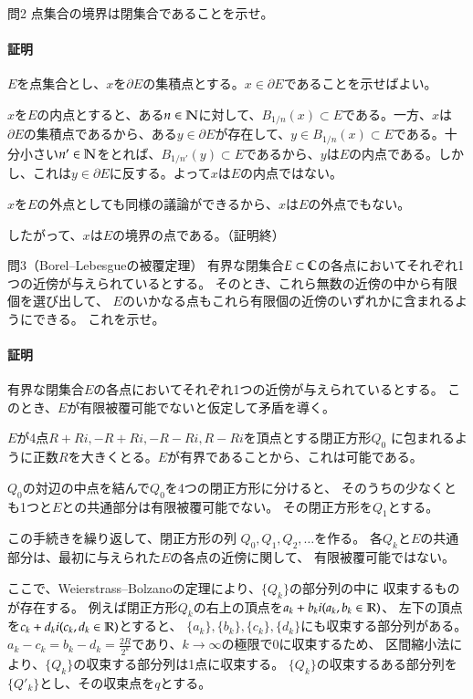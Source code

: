 \begin{mysimplebox}{問2}
    点集合の境界は閉集合であることを示せ。 
\end{mysimplebox}
\paragraph{証明}
$E$を点集合とし、$x$を$\partial E$の集積点とする。$x\in\partial E$であることを示せばよい。

$x$を$E$の内点とすると、ある$n\in\mathbb{N}$に対して、$B_{1/n}(x)\subset E$である。一方、$x$は$\partial E$の集積点であるから、ある$y\in\partial E$が存在して、$y\in B_{1/n}(x)\subset E$である。十分小さい$n'\in\mathbb{N}$をとれば、$B_{1/n'}(y)\subset E$であるから、$y$は$E$の内点である。しかし、これは$y\in\partial E$に反する。よって$x$は$E$の内点ではない。

$x$を$E$の外点としても同様の議論ができるから、$x$は$E$の外点でもない。

したがって、$x$は$E$の境界の点である。（証明終）

\begin{mysimplebox}{問3（Borel--Lebesgueの被覆定理）}
    有界な閉集合$E\subset\mathbb{C}$の各点においてそれぞれ1つの近傍が与えられているとする。
    そのとき、これら無数の近傍の中から有限個を選び出して、
    $E$のいかなる点もこれら有限個の近傍のいずれかに含まれるようにできる。
    これを示せ。
\end{mysimplebox}
\paragraph{証明}
有界な閉集合$E$の各点においてそれぞれ1つの近傍が与えられているとする。
このとき、$E$が有限被覆可能でないと仮定して矛盾を導く。

$E$が4点$R+Ri, -R+Ri, -R-Ri, R-Ri$を頂点とする閉正方形$Q_0$
に包まれるように正数$R$を大きくとる。$E$が有界であることから、これは可能である。

$Q_0$の対辺の中点を結んで$Q_0$を4つの閉正方形に分けると、
そのうちの少なくとも1つと$E$との共通部分は有限被覆可能でない。
その閉正方形を$Q_1$とする。

この手続きを繰り返して、閉正方形の列
$Q_0, Q_1, Q_2,\dots$を作る。
各$Q_k$と$E$の共通部分は、最初に与えられた$E$の各点の近傍に関して、
有限被覆可能ではない。

ここで、Weierstrass--Bolzanoの定理により、$\{Q_k\}$の部分列の中に
収束するものが存在する。
例えば閉正方形$Q_k$の右上の頂点を$a_k+b_{k}i (a_k,b_k\in\mathbb{R})$、
左下の頂点を$c_k+d_{k}i (c_k,d_k\in\mathbb{R})$とすると、
$\{a_k\}, \{b_k\},\{c_k\},\{d_k\}$にも収束する部分列がある。
$a_k-c_k=b_k-d_k=\frac{2R}{2^k}$であり、$k\longrightarrow\infty$の極限で0に収束するため、
区間縮小法により、$\{Q_k\}$の収束する部分列は1点に収束する。
$\{Q_k\}$の収束するある部分列を$\{Q'_k\}$とし、その収束点を$q$とする。

